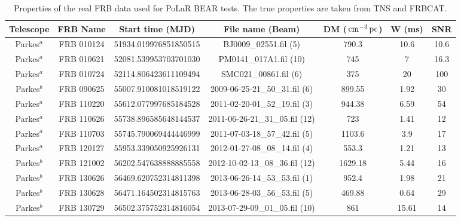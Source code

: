 \begin{sidewaystable}
    \centering
    \caption[Properties of real FRB data]{Properties of the real FRB data used for PoLaR BEAR tests. The true properties are taken from TNS and FRBCAT.}
    \begin{tabular}{ccccccc}
        \hline
        Telescope       & FRB Name   & Start time (MJD)      & File name (Beam)                          & DM ($\,\text{cm}^{-3}\,\text{pc}$) & W (ms) & SNR  \\
        \hline
        Parkes$^{a}$         & FRB 010124 & 51934.019976851850515 & BJ0009\_02551.fil (5)                    & 790.3       & 10.6     & 10.6 \\
        Parkes$^{a}$          & FRB 010621 & 52081.539953703701030 & PM0141\_017A1.fil (10)                    & 745         & 7        & 16.3 \\
        Parkes$^{a}$          & FRB 010724 & 52114.806423611109494 & SMC021\_00861.fil (6)                    & 375         & 20       & 100  \\
        Parkes$^{b}$         & FRB 090625 & 55007.910081018519122 & 2009-06-25-21\_50\_31.fil (6)            & 899.55      & 1.92     & 30   \\
        Parkes$^{a}$          & FRB 110220 & 55612.077997685184528 & 2011-02-20-01\_52\_19.fil (3)            & 944.38      & 6.59     & 54   \\
        Parkes$^{a}$          & FRB 110626 & 55738.896585648144537 & 2011-06-26-21\_31\_05.fil (12)            & 723         & 1.41     & 12   \\
        Parkes$^{a}$          & FRB 110703 & 55745.790069444446999 & 2011-07-03-18\_57\_42.fil (5)            & 1103.6      & 3.9      & 17   \\
        Parkes$^{a}$          & FRB 120127 & 55953.339050925926131 & 2012-01-27-08\_08\_14.fil (4)            & 553.3       & 1.21     & 13   \\
        Parkes$^{b}$          & FRB 121002 & 56202.547638888885558 & 2012-10-02-13\_08\_36.fil (12)            & 1629.18     & 5.44     & 16   \\
        Parkes$^{b}$         & FRB 130626 & 56469.620752314811398 & 2013-06-26-14\_53\_53.fil (1)            & 952.4       & 1.98     & 21   \\
        Parkes$^{b}$         & FRB 130628 & 56471.164502314815763 & 2013-06-28-03\_56\_53.fil (5)            & 469.88      & 0.64     & 29   \\
        Parkes$^{b}$         & FRB 130729 & 56502.375752314816054 & 2013-07-29-09\_01\_05.fil (10)            & 861         & 15.61    & 14   \\

\end{tabular}
\end{sidewaystable}
